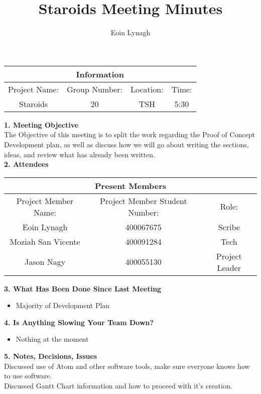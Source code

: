 \documentclass[12pt]{article}
\title{Staroids Meeting Minutes}
\author{Eoin Lynagh}
\begin{document}
\maketitle
\begin{center}
 \begin{tabular}{|c | c | c |  c |} 
 \hline
 \multicolumn{4}{|c|}{Information} \\
\hline
 Project Name: & Group Number: & Location: & Time: \\ 
 \hline
 Staroids & 20 & TSH & 5:30 \\
\hline
\end{tabular}
\end{center}
\begin{flushleft}


\textbf{1. Meeting Objective}\\
The Objective of this meeting is to split the work regarding the Proof of Concept Development plan, as well as discuss how we will go about writing the sections, ideas, and review what has already been written.\\

\textbf{2. Attendees}\\
\begin{center}
 \begin{tabular}{|c | c | c | } 
 \hline
 \multicolumn{3}{|c|}{Present Members} \\
\hline
 Project Member Name: & Project Member Student Number: & Role: \\ 
 \hline\hline
 Eoin Lynagh & 400067675 & Scribe \\
\hline
Moziah San Vicente & 400091284 & Tech \\
\hline
 Jason Nagy & 400055130 & Project Leader \\
\hline
\end{tabular}
\end{center}

\textbf{3. What Has Been Done Since Last Meeting}\\
\begin{itemize}
\item Majority of Development Plan
\end{itemize}

\textbf{4. Is Anything Slowing Your Team Down?}\\
\begin{itemize}
\item Nothing at the moment
\end{itemize}

\textbf{5. Notes, Decisions, Issues}\\
Discussed use of Atom and other software tools, make sure everyone knows how to use software.\\
Discussed Gantt Chart information and how to proceed with it's creation.\\




\end{flushleft}
\end{document}
